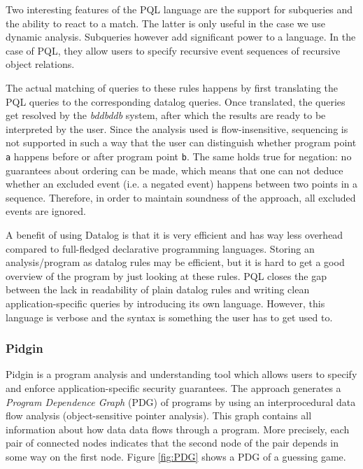Two interesting features of the PQL language are the support for subqueries and the ability to react to a match. The latter is only useful in the case we use dynamic analysis. Subqueries however add significant power to a language. In the case of PQL, they allow users to specify recursive event sequences of recursive object relations.

The actual matching of queries to these rules happens by first translating the PQL queries to the corresponding datalog queries. Once translated, the queries get resolved by the \textit{bddbddb} system, after which the results are ready to be interpreted by the user. Since the analysis used is flow-insensitive, sequencing is not supported in such a way that the user can distinguish whether program point \texttt{a} happens before or after program point \texttt{b}. The same holds true for negation: no guarantees about ordering can be made, which means that one can not deduce whether an excluded event (i.e. a negated event) happens between two points in a sequence. Therefore, in order to maintain soundness of the approach, all excluded events are ignored.

A benefit of using Datalog is that it is very efficient and has way less overhead compared to full-fledged declarative programming languages. Storing an analysis/program as datalog rules may be efficient, but it is hard to get a good overview of the program by just looking at these rules. PQL closes the gap between the lack in readability of plain datalog rules and writing clean application-specific queries by introducing its own language. However, this language is verbose and the syntax is something the user has to get used to.

\subsubsection*{Pidgin}

Pidgin\cite{PidginQL} is a program analysis and understanding tool which allows users to specify and enforce application-specific security guarantees. The approach generates a \textit{Program Dependence Graph} (PDG) of programs by using an interprocedural data flow analysis (object-sensitive pointer analysis). This graph contains all information about how data data flows through a program. More precisely, each pair of connected nodes indicates that the second node of the pair depends in some way on the first node. Figure \ref{fig:PDG} shows a PDG of a guessing game.

